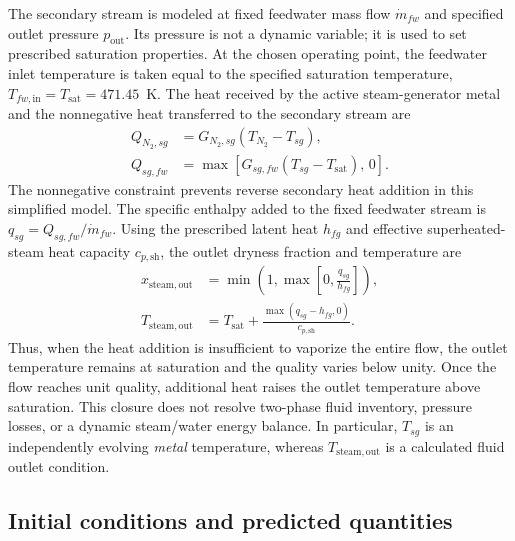 The secondary stream is modeled at fixed feedwater mass flow $\dot m_{fw}$ and specified outlet pressure $p_{\mathrm{out}}$. Its pressure is not a dynamic variable; it is used to set prescribed saturation properties. At the chosen operating point, the feedwater inlet temperature is taken equal to the specified saturation temperature, $T_{fw,\mathrm{in}}=T_{\mathrm{sat}}=471.45$~K. The heat received by the active steam-generator metal and the nonnegative heat transferred to the secondary stream are
\begin{align}
 Q_{N_2,sg}
 &=G_{N_2,sg}(T_{N_2}-T_{sg}),
 \label{eq:app:sgnitrogen}\\
 Q_{sg,fw}
 &=\max\!\left[G_{sg,fw}(T_{sg}-T_{\mathrm{sat}}),\,0\right].
 \label{eq:app:sgfeedwater}
\end{align}
The nonnegative constraint prevents reverse secondary heat addition in this simplified model. The specific enthalpy added to the fixed feedwater stream is $q_{sg}=Q_{sg,fw}/\dot m_{fw}$. Using the prescribed latent heat $h_{fg}$ and effective superheated-steam heat capacity $c_{p,\mathrm{sh}}$, the outlet dryness fraction and temperature are
\begin{align}
 x_{\mathrm{steam,out}}
 &=\min\!\left(1,\max\!\left[0,\frac{q_{sg}}{h_{fg}}\right]\right),
 \label{eq:app:steamquality}\\
 T_{\mathrm{steam,out}}
 &=T_{\mathrm{sat}}
    +\frac{\max(q_{sg}-h_{fg},0)}{c_{p,\mathrm{sh}}}.
 \label{eq:app:steamtemperature}
\end{align}
Thus, when the heat addition is insufficient to vaporize the entire flow, the outlet temperature remains at saturation and the quality varies below unity. Once the flow reaches unit quality, additional heat raises the outlet temperature above saturation. This closure does not resolve two-phase fluid inventory, pressure losses, or a dynamic steam/water energy balance. In particular, $T_{sg}$ is an independently evolving \emph{metal} temperature, whereas $T_{\mathrm{steam,out}}$ is a calculated fluid outlet condition.

\subsection{Initial conditions and predicted quantities}

